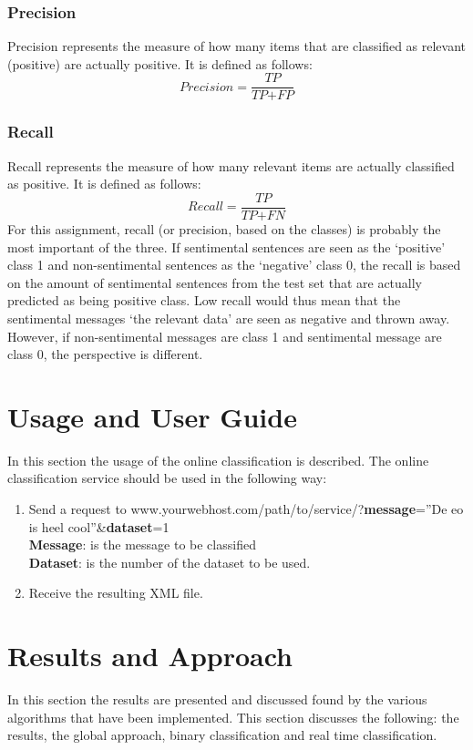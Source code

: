 \documentclass[11pt]{article}
\begin{document}
\subsubsection{Precision}
Precision represents the measure of how many items that are classified as relevant (positive) are actually positive. It is defined as follows:
\begin{equation*}
\textit{Precision} = \frac{ \textit{TP}}{\textit{TP} + \textit{FP}}
\end{equation*}
\subsubsection{Recall}
Recall represents the measure of how many relevant items are actually classified as positive. It is defined as follows:
\begin{equation*}
\textit{Recall} = \frac{ \textit{TP}}{\textit{TP} + \textit{FN}}
\end{equation*}
For this assignment, recall (or precision, based on the classes) is probably the most important of the three. If sentimental sentences are seen as the ‘positive’ class 1 and non-sentimental sentences as the ‘negative’ class 0, the recall is based on the amount of sentimental sentences from the test set that are actually predicted as being positive class. Low recall would thus mean that the sentimental messages `the relevant data’ are seen as negative and thrown away. However, if non-sentimental messages are class 1 and sentimental message are class 0, the perspective is different.
\section{Usage and User Guide}
In this section the usage of the online classification is described. The online classification service should be used in the following way:
\begin{enumerate}
\item Send a request to www.yourwebhost.com/path/to/service/?\textbf{message}=”De eo is heel cool”\&\textbf{dataset}=1\\
\textbf{Message}: is the message to be classified\\
\textbf{Dataset}: is the number of the dataset to be used.
\item Receive the resulting XML file.
\end{enumerate}
\section{Results and Approach}
In this section the results are presented and discussed found by the various algorithms that have been implemented. This section discusses the following: the results, the global approach, binary classification and real time classification.
\end{document}
